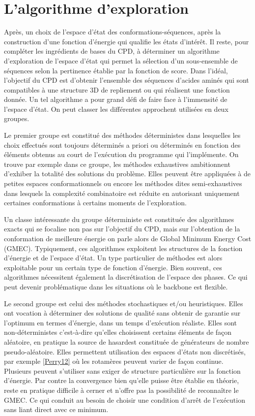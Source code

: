 \section{L'algorithme d'exploration}

Après, un choix de l'espace d'état des conformations-séquences, après la construction d'une fonction d'énergie qui qualifie les états d'intérêt. Il reste, pour compléter les ingrédients de bases du CPD, à déterminer un algorithme d'exploration de l'espace d'état qui permet la sélection d'un sous-ensemble de séquences selon la pertinence établie par la fonction de score. Dans l'idéal, l'objectif du CPD est d'obtenir l'ensemble des séquences d'acides aminés qui sont compatibles à une structure 3D de repliement ou qui réalisent une fonction donnée. Un tel algorithme a pour grand défi de faire face à l'immensité de l'espace d'état. On peut classer les différentes approchent utilisées en deux groupes.

Le premier groupe est constitué des méthodes déterministes dans lesquelles les choix effectués sont toujours déterminés a priori ou déterminés en fonction des éléments obtenus au court de l'exécution du programme qui l'implémente. On trouve par exemple dans ce groupe, les méthodes exhaustives ambitionnent d'exhiber la totalité des solutions du problème. Elles peuvent être appliquées à de petites espaces conformationnels ou encore les méthodes dites semi-exhaustives dans lesquels la complexité combinatoire est réduite en autorisant uniquement certaines conformations à certains moments de l'exploration.

Un classe intéressante du groupe déterministe est constituée des algorithmes exacts qui se focalise non pas sur l'objectif du CPD, mais sur l'obtention de la conformation de meilleure énergie on parle alors de \og Global Minimum Energy Cost \fg (GMEC).
Typiquement, ces algorithmes exploitent les structures de la fonction d'énergie et de l'espace d'état. Un type particulier de méthodes est alors exploitable pour un certain type de fonction d'énergie. Bien souvent, ces algorithmes nécessitent également la discrétisation de l'espace des phases. Ce qui peut devenir problématique dans les situations où le backbone est flexible.
  
Le second groupe est celui des méthodes stochastiques et/ou heuristiques. Elles ont vocation à déterminer des solutions de qualité sans obtenir de garantie sur l'optimum en termes d'énergie, dans un temps d'exécution réaliste. Elles sont non-déterministes c'est-à-dire qu'elles choisissent certains éléments de façon aléatoire, en pratique la \og source de hasard\fg est constituée de générateurs de nombre pseudo-aléatoire. Elles permettent utilisation des espaces d'états non discrétisés, par exemple \ref{Perry12} où les rotamères peuvent varier de façon continue. Plusieurs peuvent s'utiliser sans exiger de structure particulière sur la fonction d'énergie. Par contre la convergence bien qu'elle puisse être établie en théorie, reste en pratique difficile à cerner et n'offre pas la possibilité de reconnaître le GMEC. Ce qui conduit au besoin de choisir une condition d'arrêt de l'exécution sans liant direct avec ce minimum.  

